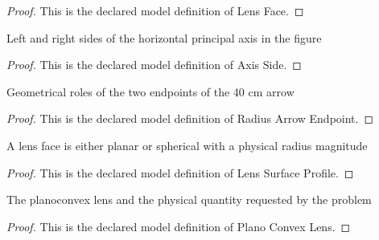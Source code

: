 \begin{proof}
  This is the declared model definition of Lens Face.
\end{proof}
\begin{definition}
  \label{def:physics:phyx-mini-0065:phyxminiproblems-problemphyxmini0065-axisside}
  Left and right sides of the horizontal principal axis in the figure
\end{definition}
\begin{proof}
  This is the declared model definition of Axis Side.
\end{proof}
\begin{definition}
  \label{def:physics:phyx-mini-0065:phyxminiproblems-problemphyxmini0065-radiusarrowendpoint}
  Geometrical roles of the two endpoints of the 40 cm arrow
\end{definition}
\begin{proof}
  This is the declared model definition of Radius Arrow Endpoint.
\end{proof}
\begin{definition}
  \label{def:physics:phyx-mini-0065:phyxminiproblems-problemphyxmini0065-lenssurfaceprofile}
  A lens face is either planar or spherical with a physical radius magnitude
\end{definition}
\begin{proof}
  This is the declared model definition of Lens Surface Profile.
\end{proof}
\begin{definition}
  \label{def:physics:phyx-mini-0065:phyxminiproblems-problemphyxmini0065-planoconvexlens}
  The planoconvex lens and the physical quantity requested by the problem
\end{definition}
\begin{proof}
  This is the declared model definition of Plano Convex Lens.
\end{proof}
